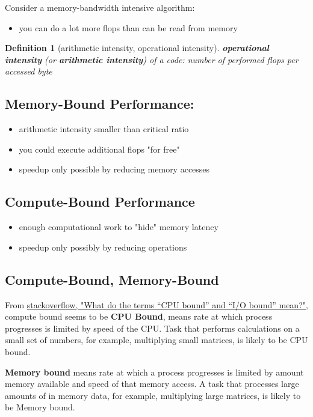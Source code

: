 \documentclass[10pt]{amsart}
\newtheorem{definition}{Definition}
\begin{document}
\begin{multicols*}{2}
Consider a memory-bandwidth intensive algorithm: 
\begin{itemize}
	\item you can do a lot more flops than can be read from memory
\end{itemize}
\begin{definition}[arithmetic intensity, operational intensity]
	\textbf{operational intensity} (or \textbf{arithmetic intensity}) of a code: number of performed flops per accessed byte
\end{definition}

\subsection{Memory-Bound Performance:}
\begin{itemize}
	\item arithmetic intensity smaller than critical ratio
	\item you could execute additional flops "for free"
	\item speedup only possible by reducing memory accesses
\end{itemize}



\subsection{Compute-Bound Performance}
\begin{itemize}
	\item enough computational work to "hide" memory latency 
	\item speedup only possibly by reducing operations
\end{itemize}

\subsection{Compute-Bound, Memory-Bound}

From \href{https://stackoverflow.com/questions/868568/what-do-the-terms-cpu-bound-and-i-o-bound-mean}{stackoverflow, "What do the terms “CPU bound” and “I/O bound” mean?"}, compute bound seems to be \textbf{CPU Bound}, means rate at which process progresses is limited by speed of the CPU.  Task that performs calculations on a small set of numbers, for example, multiplying small matrices, is likely to be CPU bound.  

\textbf{Memory bound} means rate at which a process progresses is limited by amount memory available and speed of that memory access.  A task that processes large amounts of in memory data, for example, multiplying large matrices, is likely to be Memory bound.  



\end{multicols*}
\end{document}
